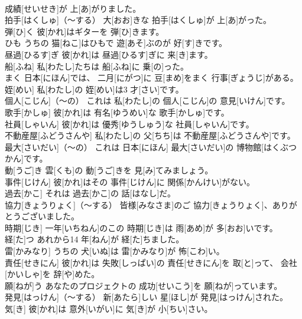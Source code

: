 \documentclass[8pt]{extreport}
\begin{document}
\begin{CJK}{UTF8}{min}
\\	成績[せいせき]が 上[あ]がりました。		
\\	拍手[はくしゅ]（～する）	大[おお]きな 拍手[はくしゅ]が 上[あ]がった。		
\\	弾[ひ]く	彼[かれ]はギターを 弾[ひ]きます。		
\\	ひも	うちの 猫[ねこ]はひもで 遊[あそ]ぶのが 好[す]きです。		
\\	昼過[ひるす]ぎ	彼[かれ]は 昼過[ひるす]ぎに 来[き]ます。		
\\	船[ふね]	私[わたし]たちは 船[ふね]に 乗[の]った。		
\\	まく	日本[にほん]では、 二月[にがつ]に 豆[まめ]をまく 行事[ぎょうじ]がある。		
\\	姪[めい]	私[わたし]の 姪[めい]は3 才[さい]です。		
\\	個人[こじん]（～の）	これは 私[わたし]の 個人[こじん]の 意見[いけん]です。		
\\	歌手[かしゅ]	彼[かれ]は 有名[ゆうめい]な 歌手[かしゅ]です。		
\\	社員[しゃいん]	彼[かれ]は 優秀[ゆうしゅう]な 社員[しゃいん]です。		
\\	不動産屋[ふどうさんや]	私[わたし]の 父[ちち]は 不動産屋[ふどうさんや]です。		
\\	最大[さいだい]（～の）	これは 日本[にほん] 最大[さいだい]の 博物館[はくぶつかん]です。		
\\	動[うご]き	雲[くも]の 動[うご]きを 見[み]てみましょう。		
\\	事件[じけん]	彼[かれ]はその 事件[じけん]に 関係[かんけい]がない。		
\\	過去[かこ]	それは 過去[かこ]の 話[はなし]だ。		
\\	協力[きょうりょく]（～する）	皆様[みなさま]のご 協力[きょうりょく]、ありがとうございました。		
\\	時期[じき]	一年[いちねん]のこの 時期[じき]は 雨[あめ]が 多[おお]いです。		
\\	経[た]つ	あれから14 年[ねん]が 経[た]ちました。		
\\	雷[かみなり]	うちの 犬[いぬ]は 雷[かみなり]が 怖[こわ]い。		
\\	責任[せきにん]	彼[かれ]は 失敗[しっぱい]の 責任[せきにん]を 取[と]って、 会社[かいしゃ]を 辞[や]めた。		
\\	願[ねが]う	あなたのプロジェクトの 成功[せいこう]を 願[ねが]っています。		
\\	発見[はっけん]（～する）	新[あたら]しい 星[ほし]が 発見[はっけん]された。		
\\	気[き]	彼[かれ]は 意外[いがい]に 気[き]が 小[ちい]さい。		

\end{CJK}
\end{document}
